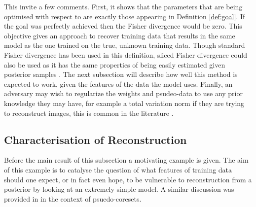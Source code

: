 \documentclass[hyperref]{article}
\theoremstyle{plain}
\theoremstyle{remark}
\begin{document}
This invite a few comments. First, it shows that the parameters that are being optimised with respect to are exactly those appearing in Definition \ref{def:goal}. If the goal was perfectly achieved then the Fisher divergence would be zero. This objective gives an approach to recover training data that results in the same model as the one trained on the true, unknown training data. Though standard Fisher divergence has been used in this definition, sliced Fisher divergence could also be used as it has the same properties of being easily estimated given posterior samples \citep{song2019sliced}. The next subsection will describe how well this method is expected to work, given the features of the data the model uses. Finally, an adversary may wish to regularize the weights and psudeo-data to use any prior knowledge they may have, for example a total variation norm if they are trying to reconstruct images, this is common in the literature \citet{buzaglo2023deconstructing}.



\subsection{Characterisation of Reconstruction}\label{subsec:bayesian_char}
Before the main result of this subsection a motivating example is given. The aim of this example is to catalyse the question of what features of training data should one expect, or in fact even hope, to be vulnerable to reconstruction from a posterior by looking at an extremely simple model. A similar discussion was provided in \citet{Manousakas2020} in the context of psuedo-coresets.
\end{document}
